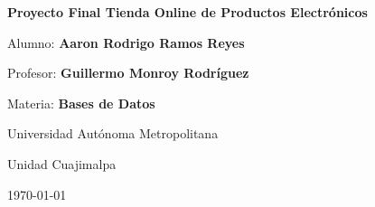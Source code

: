 \begin{titlepage}
    \centering
    \vspace*{2cm}
    
    {\Huge\bfseries Proyecto Final Tienda Online de Productos Electrónicos \par}
    \vspace{2cm}
    
   
    
    {\large Alumno: \textbf{Aaron Rodrigo Ramos Reyes} \par}
    {\large Profesor: \textbf{Guillermo Monroy Rodríguez} \par}
    {\large Materia: \textbf{Bases de Datos} \par}
    {\large Universidad Autónoma Metropolitana \par}
    {\large Unidad Cuajimalpa \par}
    \vspace{1cm}
    
    {\large \today \par}
\end{titlepage}
